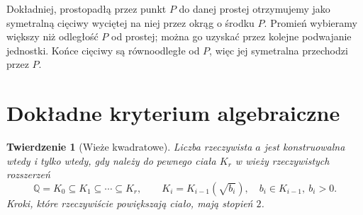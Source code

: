 \documentclass[11pt,a4paper,oneside]{book}
\numberwithin{equation}{section}
\theoremstyle{plain}
\newtheorem{twierdzenie}{Twierdzenie}[chapter]
\theoremstyle{definition}
\theoremstyle{remark}
\newcommand{\Q}{\mathbb{Q}}
\begin{document}
Dokładniej, prostopadłą przez punkt $P$ do danej prostej otrzymujemy jako symetralną cięciwy wyciętej na niej przez okrąg o środku $P$. Promień wybieramy większy niż odległość $P$ od prostej; można go uzyskać przez kolejne podwajanie jednostki. Końce cięciwy są równoodległe od $P$, więc jej symetralna przechodzi przez $P$.

\section{Dokładne kryterium algebraiczne}

\begin{twierdzenie}[Wieże kwadratowe]
Liczba rzeczywista $a$ jest konstruowalna wtedy i tylko wtedy, gdy należy do pewnego ciała $K_r$ w wieży rzeczywistych rozszerzeń
\[
\Q=K_0\subseteq K_1\subseteq\cdots\subseteq K_r,\qquad
K_i=K_{i-1}(\sqrt{b_i}),\quad b_i\in K_{i-1},\ b_i>0.
\]
Kroki, które rzeczywiście powiększają ciało, mają stopień $2$.
\end{twierdzenie}
\end{document}
